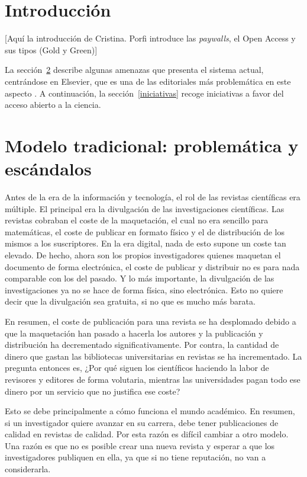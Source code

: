 \section{Introducción}

[Aquí la introducción de Cristina. Porfi introduce las \textit{paywalls}, el Open Access y sus tipos (Gold y Green)]

La sección~\ref{amenazas} describe algunas amenazas que presenta el sistema actual, centrándose en Elsevier, que es una de las editoriales más problemática en este aspecto \cite{costknowledge}. A continuación, la sección~\ref{iniciativas} recoge iniciativas a favor del acceso abierto a la ciencia.

\section{Modelo tradicional: problemática y escándalos}\label{amenazas}

Antes de la era de la información y tecnología, el rol de las revistas científicas era múltiple. El principal era la divulgación de las investigaciones científicas. Las revistas cobraban el coste de la maquetación, el cual no era sencillo para matemáticas, el coste de publicar en formato físico y el de distribución de los mismos a los suscriptores. En la era digital, nada de esto supone un coste tan elevado. De hecho, ahora son los propios investigadores quienes maquetan el documento de forma electrónica, el coste de publicar y distribuir no es para nada comparable con los del pasado. Y lo más importante, la divulgación de las investigaciones ya no se hace de forma física, sino electrónica. Esto no quiere decir que la divulgación sea gratuita, si no que es mucho más barata.

En resumen, el coste de publicación para una revista se ha desplomado debido a que la maquetación han pasado a hacerla los autores y la publicación y distribución ha decrementado significativamente. Por contra, la cantidad de dinero que gastan las bibliotecas universitarias en revistas se ha incrementado. La pregunta entonces es, ¿Por qué siguen los científicos haciendo la labor de revisores y editores de forma volutaria, mientras las universidades pagan todo ese dinero por un servicio que no justifica ese coste?

Esto se debe principalmente a cómo funciona el mundo académico. En resumen, si un investigador quiere avanzar en su carrera, debe tener publicaciones de calidad en revistas de calidad. Por esta razón es difícil cambiar a otro modelo. Una razón es que no es posible crear una nueva revista y esperar a que los investigadores publiquen en ella, ya que si no tiene reputación, no van a considerarla.

